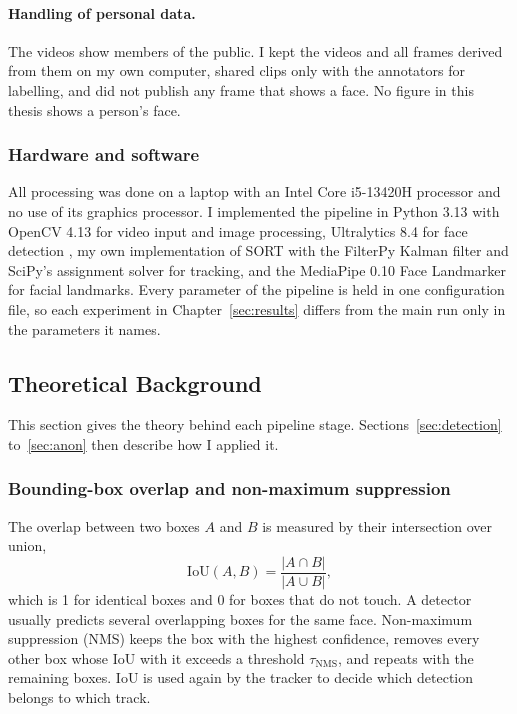 \paragraph{Handling of personal data.}
The videos show members of the public. I kept the videos and all frames derived from them
on my own computer, shared clips only with the annotators for labelling, and did not
publish any frame that shows a face. No figure in this thesis shows a person's face.

\subsubsection{Hardware and software}

All processing was done on a laptop with an Intel Core i5-13420H processor and no use of
its graphics processor. I implemented the pipeline in Python 3.13 with OpenCV 4.13 for
video input and image processing, Ultralytics 8.4 for face detection \cite{yolov8}, my own
implementation of SORT with the FilterPy Kalman filter and SciPy's assignment solver for
tracking, and the MediaPipe 0.10 Face Landmarker \cite{lugaresi2019mediapipe} for facial
landmarks. Every parameter of the pipeline is held in one configuration file, so each
experiment in Chapter~\ref{sec:results} differs from the main run only in the parameters
it names.

\subsection{Theoretical Background}
\label{sec:theory}

This section gives the theory behind each pipeline stage. Sections~\ref{sec:detection}
to~\ref{sec:anon} then describe how I applied it.

\subsubsection{Bounding-box overlap and non-maximum suppression}

The overlap between two boxes $A$ and $B$ is measured by their intersection over union,
\begin{equation}
  \mathrm{IoU}(A, B) = \frac{|A \cap B|}{|A \cup B|},
  \label{eq:iou}
\end{equation}
which is 1 for identical boxes and 0 for boxes that do not touch. A detector usually
predicts several overlapping boxes for the same face. Non-maximum suppression (NMS) keeps
the box with the highest confidence, removes every other box whose IoU with it exceeds a
threshold $\tau_{\mathrm{NMS}}$, and repeats with the remaining boxes. IoU is used again
by the tracker to decide which detection belongs to which track.

